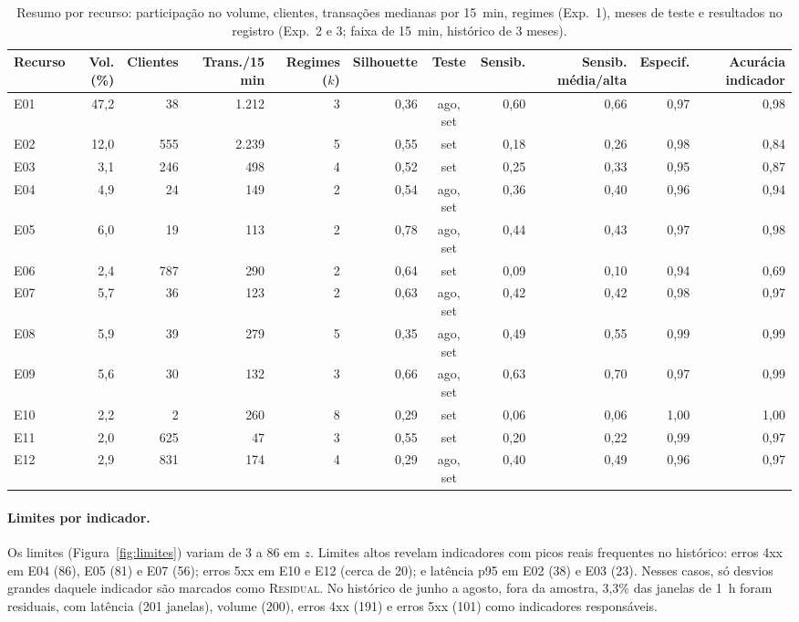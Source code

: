 \documentclass[sigconf,nonacm]{acmart}
\newcommand{\Residual}{\textsc{Residual}\xspace}
\begin{document}
\begin{table}[t]
  \caption{Resumo por recurso: participação no volume, clientes, transações medianas por 15~min, regimes (Exp.~1), meses de teste e resultados no registro (Exp.~2 e 3; faixa de 15~min, histórico de 3 meses).}
  \label{tab:recursos}
  \small
  \begin{tabular}{lrrrrrcrrrr}
    \toprule
    Recurso & Vol. (\%) & Clientes & Trans./15 min & Regimes ($k$) & Silhouette & Teste & Sensib. & Sensib. média/alta & Especif. & Acurácia indicador \\
    \midrule
    E01 & 47,2 & 38  & 1.212 & 3 & 0,36 & ago, set & 0,60 & 0,66 & 0,97 & 0,98 \\
    E02 & 12,0 & 555 & 2.239 & 5 & 0,55 & set & 0,18 & 0,26 & 0,98 & 0,84 \\
    E03 & 3,1  & 246 & 498   & 4 & 0,52 & set & 0,25 & 0,33 & 0,95 & 0,87 \\
    E04 & 4,9  & 24  & 149   & 2 & 0,54 & ago, set & 0,36 & 0,40 & 0,96 & 0,94 \\
    E05 & 6,0  & 19  & 113   & 2 & 0,78 & ago, set & 0,44 & 0,43 & 0,97 & 0,98 \\
    E06 & 2,4  & 787 & 290   & 2 & 0,64 & set & 0,09 & 0,10 & 0,94 & 0,69 \\
    E07 & 5,7  & 36  & 123   & 2 & 0,63 & ago, set & 0,42 & 0,42 & 0,98 & 0,97 \\
    E08 & 5,9  & 39  & 279   & 5 & 0,35 & ago, set & 0,49 & 0,55 & 0,99 & 0,99 \\
    E09 & 5,6  & 30  & 132   & 3 & 0,66 & ago, set & 0,63 & 0,70 & 0,97 & 0,99 \\
    E10 & 2,2  & 2   & 260   & 8 & 0,29 & set & 0,06 & 0,06 & 1,00 & 1,00 \\
    E11 & 2,0  & 625 & 47    & 3 & 0,55 & set & 0,20 & 0,22 & 0,99 & 0,97 \\
    E12 & 2,9  & 831 & 174   & 4 & 0,29 & ago, set & 0,40 & 0,49 & 0,96 & 0,97 \\
    \bottomrule
  \end{tabular}
\end{table}

\paragraph{Limites por indicador.} Os limites (Figura~\ref{fig:limites}) variam de 3 a 86 em $z$. Limites altos revelam indicadores com picos reais frequentes no histórico: erros 4xx em E04 (86), E05 (81) e E07 (56); erros 5xx em E10 e E12 (cerca de 20); e latência p95 em E02 (38) e E03 (23). Nesses casos, só desvios grandes daquele indicador são marcados como \Residual. No histórico de junho a agosto, fora da amostra, 3,3\% das janelas de 1~h foram residuais, com latência (201 janelas), volume (200), erros 4xx (191) e erros 5xx (101) como indicadores responsáveis.
\end{document}
